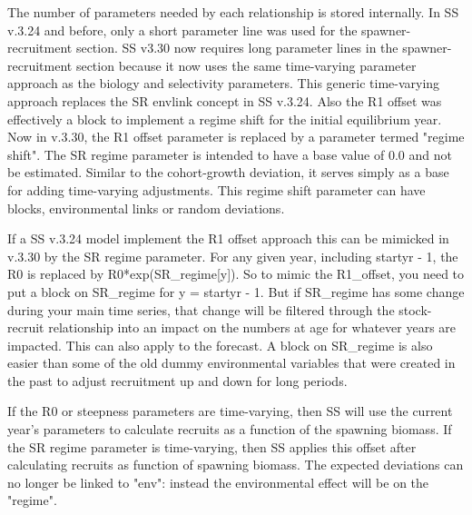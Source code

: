 The number of parameters needed by each relationship is stored internally.  In SS v.3.24 and before, only a short parameter line was used for the spawner-recruitment section. SS v3.30 now requires long parameter lines in the spawner-recruitment section because it now uses the same time-varying parameter approach as the biology and selectivity parameters.  This generic time-varying approach replaces the SR envlink concept in SS v.3.24.  Also the R1 offset was effectively a block to implement a regime shift for the initial equilibrium year.  Now in v.3.30, the R1 offset parameter is replaced by a parameter termed "regime shift".  The SR regime parameter is intended to have a base value of 0.0 and not be estimated.  Similar to the cohort-growth deviation, it serves simply as a base for adding time-varying adjustments. This regime shift parameter can have blocks, environmental links or random deviations. 

If a SS v.3.24 model implement the R1 offset approach this can be mimicked in v.3.30 by the SR regime parameter. For any given year, including startyr - 1, the R0 is replaced by R0*exp(SR\_regime[y]). So to mimic the R1\_offset, you need to put a block on SR\_regime for y = startyr - 1. But if SR\_regime has some change during your main time series, that change will be filtered through the stock-recruit relationship into an impact on the numbers at age for whatever years are impacted. This can also apply to the forecast. A block on SR\_regime is also easier than some of the old dummy environmental variables that were created in the past to adjust recruitment up and down for long periods.

If the R0 or steepness parameters are time-varying, then SS will use the current year's parameters to calculate recruits as a function of the spawning biomass.  If the SR regime parameter is time-varying, then SS applies this offset after calculating recruits as function of spawning biomass.  The expected deviations can no longer be linked to "env": instead the environmental effect will be on the "regime". 


